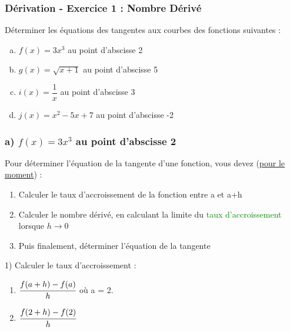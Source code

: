 \documentclass[t]{beamer}
\begin{document}
	\begin{frame}[label=pagebanale]
		\frametitle{Dérivation - Exercice 1 : Nombre Dérivé}
		\pause
		Déterminer les équations des tangentes aux courbes des fonctions suivantes :
		\pause
		\begin{enumerate}[a)]
			\item<+-> $f(x) = 3x^3$ au point d'abscisse 2
			\item<+-> $g(x) = \sqrt{x+1}$ au point d'abscisse 5
			\item<+-> $i(x) = \dfrac{1}{x}$ au point d'abscisse 3
			\item<+-> $j(x) = x^2 - 5x +7$ au point d'abscisse -2
		\end{enumerate}
	\end{frame}

	\begin{frame}
		\frametitle{a) $f(x) = 3x^3$ au point d'abscisse 2}
		\pause
		\begin{block}{}
			Pour déterminer l'équation de la tangente d'une fonction, vous devez (\underline{pour le moment}) :
			\pause
			\begin{enumerate}[1.]
				\item Calculer le taux d'accroissement de la fonction entre a et a+h
				\pause
				\item Calculer le nombre dérivé, \pause en calculant la limite du \textcolor{green}{taux d'accroissement} lorsque $h \rightarrow 0$
				\pause
				\item Puis finalement, déterminer l'équation de la tangente
			\end{enumerate}
		\end{block}
		\pause
		\begin{block}{1) Calculer le taux d'accroissement :}
			\pause
			\begin{enumerate}[]
				\item<+-> $\cfrac{f(a+h)-f(a)}{h}$ où a = 2.
				\item<+-> \(\cfrac{f(2+h)-f(2)}{h} \)
			\end{enumerate}
		\end{block}
	\end{frame}
\end{document}
